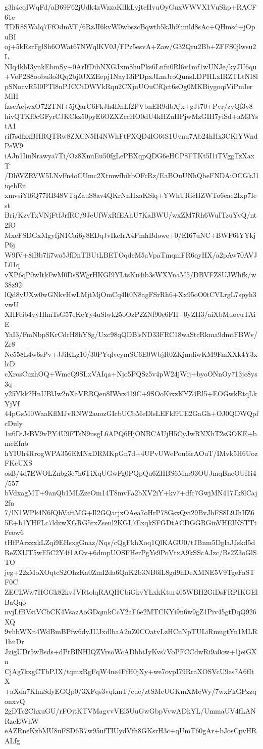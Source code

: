 g3h4cqIWqFd/aB69F62jUdk4zWzzaKlIkLyjteHvuOyGuxWWVX1VuShp+RACF61c
TDR8SWalq7FfOdmVF/6RzJI6kvW0wbszcBqwtb5kJh9hmld8sAc+QHmsd+jOpuBI
oj+5kRsrFglSh6OWat67NWqlKV0J/FPz5esvA+Zaw/G32Qru2Bb+ZFFS0jlwsu2L
NIq4khI3ynkEbmSy+0ArIfDibNXGJxm8huPks6Lnfn0Rl6v1mf1wUNJe/kyJU6qu
+VeP2S8oobu3o3Qq2bj0JXZEepj1Nay13iPDpxJLmJroQunsLDPHLxIRZTLtNI8l
pSNocvR5I0PTl8nPJCCtDWVkRqu2CXjnUOuCfQct6sOg0MKBiygoqiViPmIerMlH
fzscAcjwxO722TNl+5jQarC6FkJh4DnLf2PVbnER9dbXjx+gJt70+Pvr/zyQf3v8
hivQTKf0cGFyrCJKCkz50pyE6OZXZccHO0dU4kHZuHPjwMzGIH7yiSd+aM3YstA1
rif7sdfzxBHRQTRw8ZXCN5H4NWhFtFXQD4IG6tS1Uvnu7Ab24hHx3CKiYWndPeW9
iAJn1IiuNrawya7Ti/Oz8XnuEu50fgLePBXqpQDG6eHCP8FTKt5I1iTVggTzXaxT
/DhWZRVW5LNvFn4oCUmc2XtmwfbikbOFcRz/EaBOuUNhQbeFNDAiOCGkJ1iqebEu
xmvsiYl6Q77RB48VTqZauS8av4QKrNnHxaKSlq+YWhURicHZWTo6eae2Ixp7Iest
Bri/KzvTxVNjFtfJrfRC/9JeUfWxRfEAhU7KaBWU/wxZM7Rh6WuITzuYvQ/nt2fO
MxeFSDGxMgyfjN1Cai6y8EDqJvIkeIrA4PmhBdowe+0/EI67uNC+BWF6tYYkjP6j
W9fV+8iBb7li7wo5JfDnTBUtLBETOqdeM5aVpaTmqmFR6qyHX/a2pAw70AVJL01q
vXP6qP0wItkFwM0DsSWgrHKGI9YLtsKu4ib3sWXYnaM5/DBVFZ8UJWhfk/w38z92
lQd8yUXw0wGNkvHwLMjtMjOmCq4lt0N8agFSrRh6+Xx95oO0tCVLrgL7spyh3vwU
XHFeib4vyHhnTsG57eKeYy4uSlwk25oOzP2ZNf90e6FH+0yZH3/aiXbMuocuTAiE
YaI3/FmNbpSKrCdrH8hY8g/Uxc98qQDBlsND33FRC18waStcRkma9dmtFBWv/Zr8
Ne558L4w6sPv+JJiKLg10/30PYqlveymSC6E0WbjR0ZKjmdiwKM9FmXXk4Y3xlcD
cXrosCuzhOQ+WmeQ9SLxVAIqa+Njo5PQSz5v4pW24jWij+byoONnOy713jc8ys3q
y25Ykk2HnUBlJw2nXaVRRQen8IWvz419C+9SOoKixzKYZ4Rl5+EOGwkRtqLkYjVf
44pGsM0WaaKflMJvRNW2auozGIcbUCbMeDlsLEFkl9UE2GaGh+OJ0QDWQpfcDuly
1u6DiJsBV9vPY4U9FTsN9usgL6APQ6HjONBCAUjH5CyJwRNXhT2sGOKE+bmeEfnb
hYIUh4RrogWPA356EMNxDRMKpGn7d+4UPvUWePou6irAOuT/IMvk5H6UozFKcUXS
osB/4d7EWOLZnbg3e7h6TiXqUGwFg0PQpQu6ZHBS6Mnr93OUJmqBneOUf1i4/557
bVdxagMT+9anQb1MLZzeOm14T8mvFa2bXV2iY+kv7+dfc7GwjMN417Jk8lCaj2fn
7/lN1WPk4N6fQhVaftMG+Il2GQarjxOAea7oHrP78GsxQvi29BvJhFS8L9JhIfZ6
5E+b1YHFLc7ldzwXGRG5rxZsenl2KGL7ExqkSFGDtACDGGRGinVHEIKSTTtFeow6
tHfPArzzxkLZqi9EHsxgGnaz/Nqs/cQgFkhXoq1QlKAGU0/tJBnm5DglaJJskd5d
ReZXlJT5wE5C2Y4f1AOv+6dmpUOSFHerPgYs9PoVtxA9kSScAJzc/Bs2Z3oGlSTO
jeg+22zMoXOqtcS2OhzKa0ZmI2da6QnK2b3NB6fL8gd9hDeXMNE5V9TgeFaSTF0C
ZECLWw7HGGk82kvJVRtolqRAQHCbiGkvYLxkKtur405WBH2GiDsFRPIKGElBaQqo
nvjLfBVstVCbCK4VsazAoGDqmkCcY2aF6e2MTCKYi9n6w9gZ1Piv45gtDqQ926XQ
9vhbWXn4WdBmBPfw6dyJUJxdlbaA2nZ0COatvLzHCuNpTULiRmugtYn1MLR1hnDr
JzigUDr5wBsds+dPtBlNHIQZVrsoWcADhbiJyKvs7VoPFCCdwRi9a0ow+1jeiGXn
CjAg7kxgCTbPJX/tqmxRgFqW4ne4FfH0jXy+we7ovpI79RraXOSVcU9es7A6fItX
+aXda7KhnSdyEGQp0/3XFqs3vqkmT/cue/ztSMcUGKmXMeWy/7wxFkGPzzqonxvQ
2gDTc2ChxuGU/rFOjtKTVMagvvVEl5UuGwGbpVvwADkYL/UmmaUV4fLANRzeEWhW
eAZRneKzbMU8uFSD6R7w95ufTIUydVfh8GKsrH3c+qUmT60gAr+bJosCpvHRALfg
